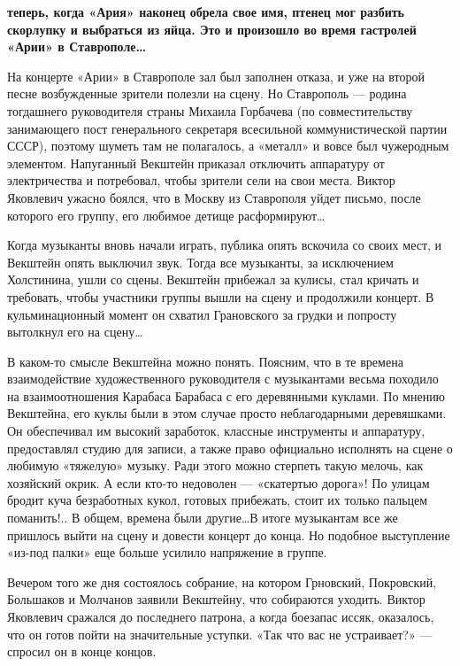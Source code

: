 \documentclass[10pt, twoside]{book}
\begin{document}
\textbf{ теперь, когда «Ария» наконец обрела свое имя, птенец мог разбить скорлупку и выбраться из яйца. Это
и произошло во время гастролей «Арии» в Ставрополе\ldots}

На концерте «Арии» в Ставрополе зал был заполнен отказа, и уже на второй песне возбужденные зрители полезли на сцену. Но
Ставрополь — родина тогдашнего руководителя страны Михаила Горбачева (по совместительству занимающего пост генерального
секретаря всесильной коммунистической партии СССР), поэтому шуметь там не полагалось, а «металл» и вовсе был чужеродным
элементом. Напуганный Векштейн приказал отключить аппаратуру от электричества и потребовал, чтобы зрители сели на свои
места. Виктор Яковлевич ужасно боялся, что в Москву из Ставрополя уйдет письмо, после которого его группу, его любимое
детище расформируют\ldots

Когда музыканты вновь начали играть, публика опять вскочила со своих мест, и Векштейн опять выключил звук. Тогда все
музыканты, за исключением Холстинина, ушли со сцены. Векштейн прибежал за кулисы, стал кричать и требовать, чтобы
участники группы вышли на сцену и продолжили концерт. В кульминационный момент он схватил Грановского за грудки и
попросту вытолкнул его на сцену\ldots

В каком-то смысле Векштейна можно понять. Поясним, что в те времена взаимодействие художественного руководителя с
музыкантами весьма походило на взаимоотношения Карабаса Барабаса с его деревянными куклами. По мнению Векштейна, его
куклы были в этом случае просто неблагодарными деревяшками. Он обеспечивал им высокий заработок, классные инструменты и
аппаратуру, предоставлял студию для записи, а также право официально исполнять на сцене о любимую «тяжелую» музыку. Ради
этого можно стерпеть такую мелочь, как хозяйский окрик. А если кто-то недоволен — «скатертью дорога»! По улицам бродит
куча безработных кукол, готовых прибежать, стоит их только пальцем поманить!.. В общем, времена были другие\ldots В
итоге музыкантам все же пришлось выйти на сцену и довести концерт до конца. Но подобное выступление «из-под палки» еще
больше усилило напряжение в группе.

Вечером того же дня состоялось собрание, на котором Грновский, Покровский, Большаков и Молчанов заявили Векштейну, что
собираются уходить. Виктор Яковлевич сражался до последнего патрона, а когда боезапас иссяк, оказалось, что он готов
пойти на значительные уступки. «Так что вас не устраивает?» — спросил он в конце концов.
\end{document}
